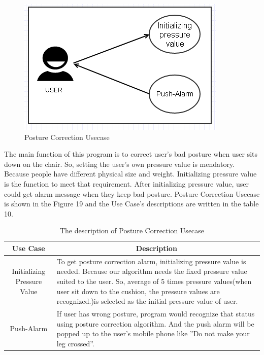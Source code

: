 \documentclass[conference]{IEEEtran}
\begin{document}
\begin{figure}[htbp]
\begin{center}
    \includegraphics[scale=0.8]{img_20.png}
    \caption{Posture Correction Usecase} 
\end{center}
\end{figure}
 	  

The main function of this program is to correct user's bad posture when user sits down on the chair. So, setting the user's own pressure value is mendatory. Because people have different physical size and weight. Initializing pressure value  is the function to meet that requirement. After initializing pressure value, user could get alarm message when they keep bad posture. Posture Correction Usecase is shown in the Figure 19 and the Use Case's descriptions are written in the table 10.

\begin{table}[h]
{\renewcommand\arraystretch{1.25}
\caption{The description of Posture Correction Usecase}
\begin{tabular}{|c|l|l|} \hline
Use Case & \multicolumn{2}{c|}{Description} \\ \hline\hline
Initializing Pressure Value& \multicolumn{2}{p{4.5cm}|}{\raggedright To get posture correction alarm, initializing pressure value is needed. Because our algorithm needs the fixed pressure value suited to the user. So,  average of 5 times pressure values(when user sit down to the cushion, the pressure values are recognized.)is selected as the initial pressure value of user.} \\ \hline
Push-Alarm& \multicolumn{2}{p{4.5cm}|}{\raggedright If user has wrong posture, program would recognize that status using posture correction algorithm. And the push alarm will be popped up to the user's mobile phone like ''Do not make your leg crossed''.} \\ \hline
\end{tabular}}
\end{table}
\end{document}
